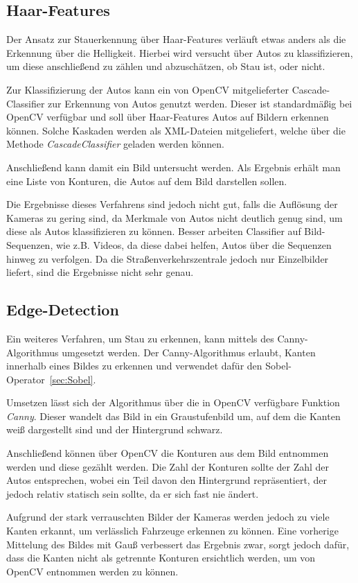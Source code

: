 \subsection{Haar-Features}
Der Ansatz zur Stauerkennung über Haar-Features verläuft etwas anders als die Erkennung über die Helligkeit.
Hierbei wird versucht über Autos zu klassifizieren, um diese anschließend zu zählen und abzuschätzen, ob Stau ist, oder nicht.

Zur Klassifizierung der Autos kann ein von OpenCV mitgelieferter Cascade-Classifier zur Erkennung von Autos genutzt werden.
Dieser ist standardmäßig bei OpenCV verfügbar und soll über Haar-Features Autos auf Bildern erkennen können.
Solche Kaskaden werden als XML-Dateien mitgeliefert, welche über die Methode {\em CascadeClassifier} geladen werden können.

Anschließend kann damit ein Bild untersucht werden. Als Ergebnis erhält man eine Liste von Konturen, die Autos auf dem Bild darstellen sollen.

Die Ergebnisse dieses Verfahrens sind jedoch nicht gut, falls die Auflösung der Kameras zu gering sind, da Merkmale von Autos nicht deutlich genug sind, um diese als Autos klassifizieren zu können.
Besser arbeiten Classifier auf Bild-Sequenzen, wie z.B. Videos, da diese dabei helfen, Autos über die Sequenzen hinweg zu verfolgen.
Da die Straßenverkehrszentrale jedoch nur Einzelbilder liefert, sind die Ergebnisse nicht sehr genau.

\subsection{Edge-Detection}
Ein weiteres Verfahren, um Stau zu erkennen, kann mittels des Canny-Algorithmus umgesetzt werden.
Der Canny-Algorithmus erlaubt, Kanten innerhalb eines Bildes zu erkennen und verwendet dafür den Sobel-Operator~\ref{sec:Sobel}.

Umsetzen lässt sich der Algorithmus über die in OpenCV verfügbare Funktion {\em Canny}.
Dieser wandelt das Bild in ein Graustufenbild um, auf dem die Kanten weiß dargestellt sind und der Hintergrund schwarz.

Anschließend können über OpenCV die Konturen aus dem Bild entnommen werden und diese gezählt werden.
Die Zahl der Konturen sollte der Zahl der Autos entsprechen, wobei ein Teil davon den Hintergrund repräsentiert, der jedoch relativ statisch sein sollte, da er sich fast nie ändert.

Aufgrund der stark verrauschten Bilder der Kameras werden jedoch zu viele Kanten erkannt, um verlässlich Fahrzeuge erkennen zu können.
Eine vorherige Mittelung des Bildes mit Gauß verbessert das Ergebnis zwar, sorgt jedoch dafür, dass die Kanten nicht als getrennte Konturen ersichtlich werden, um von OpenCV entnommen werden zu können.
	
